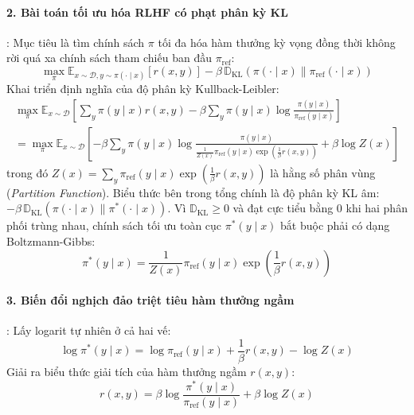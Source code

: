 \paragraph{2. Bài toán tối ưu hóa RLHF có phạt phân kỳ KL}:
Mục tiêu là tìm chính sách $\pi$ tối đa hóa hàm thưởng kỳ vọng đồng thời không rời quá xa chính sách tham chiếu ban đầu $\pi_{\text{ref}}$:
\begin{equation}
\max_{\pi} \mathbb{E}_{x \sim \mathcal{D}, y \sim \pi(\cdot \mid x)} [r(x, y)] - \beta \, \mathbb{D}_{\text{KL}}\left(\pi(\cdot \mid x) \parallel \pi_{\text{ref}}(\cdot \mid x)\right)
\end{equation}
Khai triển định nghĩa của độ phân kỳ Kullback-Leibler:
\begin{align}
\max_{\pi} \mathbb{E}_{x \sim \mathcal{D}} \left[ \sum_y \pi(y \mid x) r(x, y) - \beta \sum_y \pi(y \mid x) \log \frac{\pi(y \mid x)}{\pi_{\text{ref}}(y \mid x)} \right] \nonumber \\
= \max_{\pi} \mathbb{E}_{x \sim \mathcal{D}} \left[ - \beta \sum_y \pi(y \mid x) \log \frac{\pi(y \mid x)}{\frac{1}{Z(x)} \pi_{\text{ref}}(y \mid x) \exp\left(\frac{1}{\beta} r(x, y)\right)} + \beta \log Z(x) \right]
\end{align}
trong đó $Z(x) = \sum_y \pi_{\text{ref}}(y \mid x) \exp\left(\frac{1}{\beta} r(x, y)\right)$ là hằng số phân vùng (\textit{Partition Function}).
Biểu thức bên trong tổng chính là độ phân kỳ KL âm: $- \beta \, \mathbb{D}_{\text{KL}}\left(\pi(\cdot \mid x) \parallel \pi^*(\cdot \mid x)\right)$. Vì $\mathbb{D}_{\text{KL}} \ge 0$ và đạt cực tiểu bằng 0 khi hai phân phối trùng nhau, chính sách tối ưu toàn cục $\pi^*(y \mid x)$ bắt buộc phải có dạng Boltzmann-Gibbs:
\begin{equation}
\pi^*(y \mid x) = \frac{1}{Z(x)} \pi_{\text{ref}}(y \mid x) \exp\left( \frac{1}{\beta} r(x, y) \right)
\end{equation}

\paragraph{3. Biến đổi nghịch đảo triệt tiêu hàm thưởng ngầm}:
Lấy logarit tự nhiên ở cả hai vế:
\begin{equation}
\log \pi^*(y \mid x) = \log \pi_{\text{ref}}(y \mid x) + \frac{1}{\beta} r(x, y) - \log Z(x)
\end{equation}
Giải ra biểu thức giải tích của hàm thưởng ngầm $r(x, y)$:
\begin{equation}
r(x, y) = \beta \log \frac{\pi^*(y \mid x)}{\pi_{\text{ref}}(y \mid x)} + \beta \log Z(x)
\end{equation}

